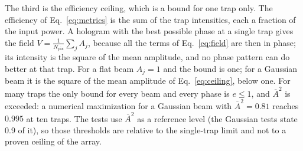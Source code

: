 The third is the efficiency ceiling, which is a bound for one trap only. The efficiency of Eq.~\eqref{eq:metrics} is the sum of the trap intensities, each a fraction of the input power. A hologram with the best possible phase at a single trap gives the field $V=\frac1{N_{\mathrm{pix}}}\sum_jA_j$, because all the terms of Eq.~\eqref{eq:field} are then in phase; its intensity is the square of the mean amplitude, and no phase pattern can do better at that trap. For a flat beam $A_j=1$ and the bound is one; for a Gaussian beam it is the square of the mean amplitude of Eq.~\eqref{eq:ceiling}, below one. For many traps the only bound for every beam and every phase is $e\le1$, and $\overline A^2$ is exceeded: a numerical maximization for a Gaussian beam with $\overline A^2=0.81$ reaches $0.995$ at ten traps. The tests use $\overline A^2$ as a reference level (the Gaussian tests state 0.9 of it), so those thresholds are relative to the single-trap limit and not to a proven ceiling of the array.
